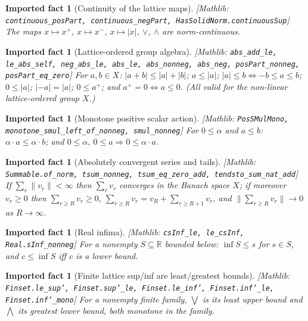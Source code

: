 \documentclass[11pt]{article}
\newcommand{\mlib}[1]{{\normalfont\scriptsize[\textsf{Mathlib:} \texttt{#1}]}}
\theoremstyle{definition}
\theoremstyle{plain}
\newtheorem{fact}[definition]{Imported fact}
\theoremstyle{remark}
\newcommand{\R}{\mathbb{R}}
\newcommand{\norm}[1]{\lVert #1\rVert}
\newcommand{\abs}[1]{\lvert #1\rvert}
\newcommand{\pos}[1]{{#1}^{+}}
\newcommand{\act}{\cdot}
\newcommand{\bigmeet}{\bigwedge}
\newcommand{\bigjoin}{\bigvee}
\begin{document}
\begin{fact}[Continuity of the lattice maps]\label{fact:contabs}
\mlib{continuous\_posPart, continuous\_negPart, HasSolidNorm.continuousSup}
The maps \(x\mapsto\pos{x}\), \(x\mapsto x^-\), \(x\mapsto\abs{x}\),
\(\vee\), \(\wedge\) are norm-continuous.
\end{fact}

\begin{fact}[Lattice-ordered group algebra]\label{fact:absgroup}
\mlib{abs\_add\_le, le\_abs\_self, neg\_abs\_le, abs\_le, abs\_nonneg, abs\_neg, posPart\_nonneg, posPart\_eq\_zero}
For \(a,b\in X\): \(\abs{a+b}\le\abs{a}+\abs{b}\); \(a\le\abs{a}\);
\(\abs{a}\le b \Leftrightarrow -b\le a\le b\); \(0\le\abs{a}\); \(\abs{-a}=\abs{a}\);
\(0\le\pos{a}\); and \(\pos{a}=0 \Leftrightarrow a\le 0\).
(All valid for the non-linear lattice-ordered group \(X\).)
\end{fact}

\begin{fact}[Monotone positive scalar action]\label{fact:possmul}
\mlib{PosSMulMono, monotone\_smul\_left\_of\_nonneg, smul\_nonneg}
For \(0\le\alpha\) and \(a\le b\): \(\alpha\act a\le\alpha\act b\); and
\(0\le\alpha,\ 0\le a\Rightarrow 0\le\alpha\act a\).
\end{fact}

\begin{fact}[Absolutely convergent series and tails]\label{fact:series}
\mlib{Summable.of\_norm, tsum\_nonneg, tsum\_eq\_zero\_add, tendsto\_sum\_nat\_add}
If \(\sum_r\norm{v_r}<\infty\) then \(\sum_r v_r\) converges in the Banach space
\(X\); if moreover \(v_r\ge 0\) then \(\sum_{r\ge R} v_r\ge 0\),
\(\sum_{r\ge R}v_r = v_R+\sum_{r\ge R+1}v_r\), and
\(\norm{\sum_{r\ge R}v_r}\to 0\) as \(R\to\infty\).
\end{fact}

\begin{fact}[Real infima]\label{fact:csinf}
\mlib{csInf\_le, le\_csInf, Real.sInf\_nonneg}
For a nonempty \(S\subseteq\R\) bounded below: \(\inf S\le s\) for \(s\in S\),
and \(c\le\inf S\) iff \(c\) is a lower bound.
\end{fact}

\begin{fact}[Finite lattice sup/inf are least/greatest bounds]\label{fact:finset}
\mlib{Finset.le\_sup', Finset.sup'\_le, Finset.le\_inf', Finset.inf'\_le, Finset.inf'\_mono}
For a nonempty finite family, \(\bigjoin\) is its least upper bound and
\(\bigmeet\) its greatest lower bound, both monotone in the family.
\end{fact}
\end{document}
